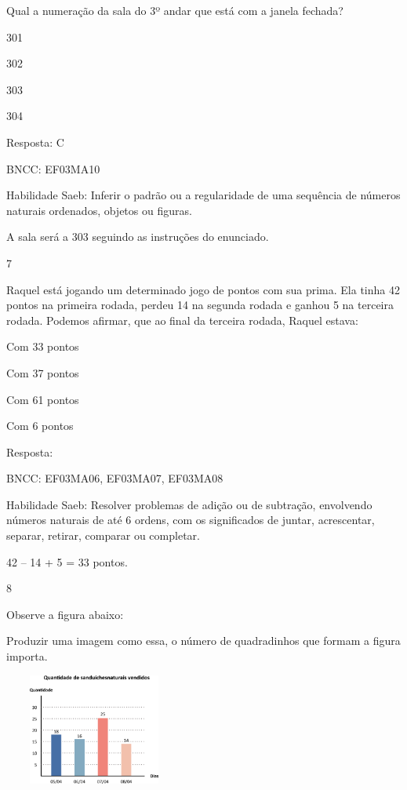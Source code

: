 \begin{escolha}
\begin{escolha}
Qual a numeração da sala do 3º andar que está com a janela fechada?

\begin{escolha}
\item
  301
\item
  302
\item
  303
\item
  304
\end{escolha}

Resposta: C

BNCC: EF03MA10

Habilidade Saeb: Inferir o padrão ou a regularidade de uma sequência de
números naturais ordenados, objetos ou figuras.

A sala será a 303 seguindo as instruções do enunciado.

\num{7}

Raquel está jogando um determinado jogo de pontos com sua prima. Ela
tinha 42 pontos na primeira rodada, perdeu 14 na segunda rodada e ganhou
5 na terceira rodada. Podemos afirmar, que ao final da terceira rodada,
Raquel estava:

\begin{escolha}
\item
  Com 33 pontos
\item
  Com 37 pontos
\item
  Com 61 pontos
\item
  Com 6 pontos
\end{escolha}

Resposta:

BNCC: EF03MA06, EF03MA07, EF03MA08

Habilidade Saeb: Resolver problemas de adição ou de subtração,
envolvendo números naturais de até 6 ordens, com os significados de
juntar, acrescentar, separar, retirar, comparar ou completar.

42 -- 14 + 5 = 33 pontos.

\num{8}

Observe a figura abaixo:

Produzir uma imagem como essa, o número de quadradinhos que formam a
figura importa.

\includegraphics[width=2.32692in,height=1.43990in]{media/image109.png}


\end{escolha}
\end{escolha}
